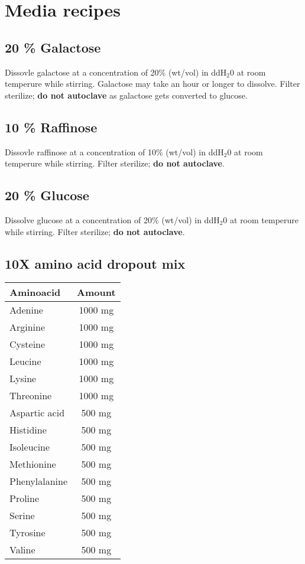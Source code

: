 \section{Media recipes}
	\subsection{20 \% Galactose}
	Dissovle galactose at a concentration of 20\% (wt/vol) in ddH$_{2}$0 at room temperure while stirring. Galactose may take an hour or longer to dissolve. Filter sterilize;  {\bf do not autoclave} as galactose gets converted to glucose.
		\subsection{10 \% Raffinose}
	Dissovle raffinose at a concentration of 10\% (wt/vol) in ddH$_{2}$0 at room temperure while stirring. Filter sterilize;  {\bf do not autoclave}.	
	\subsection{20 \% Glucose}
	Dissolve glucose at a concentration of 20\% (wt/vol) in ddH$_{2}$0 at room temperure while stirring. Filter sterilize;  {\bf do not autoclave}.
	
		\subsection{10X amino acid dropout mix}
		\begin{tabular}{l  c }
			{\bf Aminoacid} & {\bf Amount}\\
			\hline
			Adenine & 1000 mg \\
			Arginine & 1000 mg  \\
			Cysteine & 1000 mg \\
			Leucine & 1000 mg \\
			Lysine& 1000 mg \\
			Threonine & 1000 mg \\
			Aspartic acid & 500 mg \\
			Histidine & 500 mg \\
			Isoleucine & 500 mg \\
			Methionine & 500 mg \\
			Phenylalanine & 500 mg \\
			Proline & 500 mg \\
			Serine & 500 mg \\
			Tyrosine & 500 mg \\
			Valine & 500 mg \\
		\end{tabular}
		
